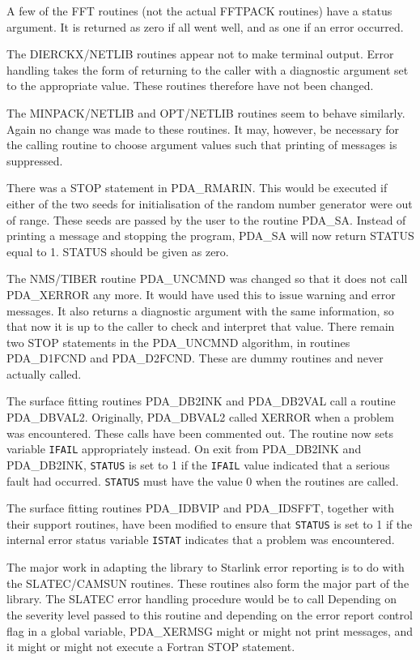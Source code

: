 \documentclass[11pt,twoside,nolof]{starlink}
\begin{document}
   A few of the FFT routines (not the actual FFTPACK routines) have a
   status argument. It is returned as zero if all went well, and as one
   if an error occurred.

   The DIERCKX/NETLIB routines appear not to make terminal output. Error
   handling takes the form of returning to the caller with a diagnostic
   argument set to the appropriate value. These routines therefore have
   not been changed.

   The MINPACK/NETLIB and OPT/NETLIB routines seem to behave similarly.
   Again no change was made to these routines. It may, however, be
   necessary for the calling routine to choose argument values such that
   printing of messages is suppressed.

   There was a STOP statement in PDA\_RMARIN. This would be executed if
   either of the two seeds for initialisation of the random number
   generator were out of range. These seeds are passed by the user to
   the routine PDA\_SA. Instead of printing a message and stopping the
   program, PDA\_SA will now return STATUS equal to 1. STATUS should
   be given as zero.

   The NMS/TIBER routine PDA\_UNCMND was changed so that it does not
   call PDA\_XERROR any more. It would have used this to issue warning
   and error messages. It also returns a diagnostic argument with the
   same information, so that now it is up to the caller to check and
   interpret that value. There remain two STOP statements in the
   PDA\_UNCMND algorithm, in routines PDA\_D1FCND and PDA\_D2FCND. These
   are dummy routines and never actually called.

The surface fitting routines PDA\_DB2INK and PDA\_DB2VAL call a
routine PDA\_DBVAL2. Originally, PDA\_DBVAL2 called XERROR when a
problem was encountered. These calls have been commented out. The
routine now sets variable \texttt{IFAIL} appropriately instead. On exit from
PDA\_DB2INK and PDA\_DB2INK, \texttt{STATUS} is set to 1 if the
\texttt{IFAIL} value indicated that a serious fault had occurred.
\texttt{STATUS} must have the
value 0 when the routines are called.

The surface fitting routines PDA\_IDBVIP and PDA\_IDSFFT, together
with their support routines, have been modified to ensure that \texttt{STATUS}
is set to 1 if the internal error status variable \texttt{ISTAT} indicates
that a problem was encountered.

   The major work in adapting the library to Starlink error reporting is
   to do with the SLATEC/\-CAMSUN routines. These routines also form the
   major part of the library. The SLATEC error handling procedure would
   be to call
   Depending on the severity level passed to this routine and depending
   on the error report control flag in a global variable, PDA\_XERMSG might
   or might not print messages, and it might or might not execute a
   Fortran STOP statement.
\end{document}
